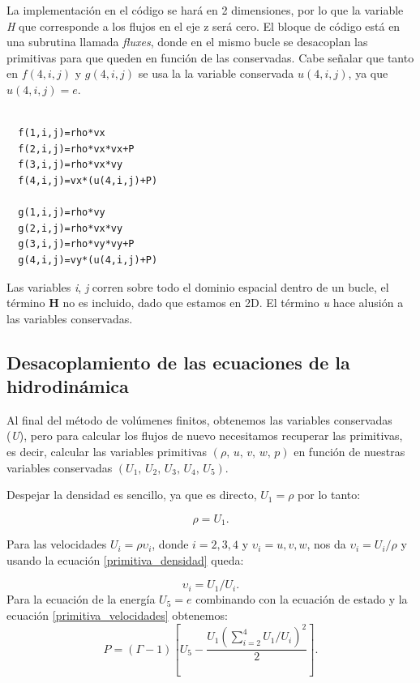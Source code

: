 \documentclass[12pt,a4paper]{book}
\begin{document}
La implementación en el código se hará en 2 dimensiones, por lo que la variable \emph{H} que corresponde a los flujos en el eje z será cero. El bloque de código está en una subrutina llamada \emph{fluxes}, 
donde en el mismo bucle se desacoplan las primitivas para que queden en función de las conservadas. Cabe señalar que tanto en $f(4,i,j)$ y $g(4,i,j)$ se usa la
la variable conservada $u(4,i,j)$, ya que $u(4,i,j) = e$. 

\begin{lstlisting}[frame=single]

  f(1,i,j)=rho*vx
  f(2,i,j)=rho*vx*vx+P
  f(3,i,j)=rho*vx*vy
  f(4,i,j)=vx*(u(4,i,j)+P)

  g(1,i,j)=rho*vy
  g(2,i,j)=rho*vx*vy
  g(3,i,j)=rho*vy*vy+P
  g(4,i,j)=vy*(u(4,i,j)+P)

\end{lstlisting}

Las variables \emph{i}, \emph{j} corren sobre todo el dominio espacial dentro de un bucle, el término $\mathbf{H}$ no es incluido, dado que estamos en 2D. 
El término \emph{u} hace alusión a las variables conservadas.

\subsection{Desacoplamiento de las ecuaciones de la hidrodinámica}\label{subsec:DesacoplamientoEcuacionesHidrodinamica}

Al final del método de volúmenes finitos, obtenemos las variables conservadas (\emph{U}), pero para calcular los flujos de nuevo necesitamos recuperar las primitivas, es decir, calcular las variables primitivas 
$(\rho, \, u, \, v,\, w, \, p )$ en función de nuestras variables conservadas $(U_1, \, U_2, \, U_3, \, U_4, \, U_5)$.

Despejar la densidad es sencillo, ya que es directo, $U_1= \rho$ por lo tanto:

\begin{equation}\label{primitiva_densidad}
\rho = U_1.
\end{equation}

\noindent Para las velocidades $U_i=\rho \upsilon_i$, donde $i=2,3,4$ y $\upsilon_i=u,v,w$, nos da $\upsilon_i= U_i/ \rho$ y usando la ecuación \ref{primitiva_densidad} queda:

\begin{equation} \label{primitiva_velocidades}
\upsilon_i = U_1/U_i.
\end{equation}
Para la ecuación   de la energía $U_5=e$ combinando con la ecuación   de estado y la ecuación \ref{primitiva_velocidades} obtenemos:
\begin{equation}
P = \left( \Gamma - 1 \right) \left[ U_5 - \frac{U_1 \left( \sum_{i=2}^{4} U_1/U_i \right)^2}{2} \right].
\end{equation}
\end{document}
